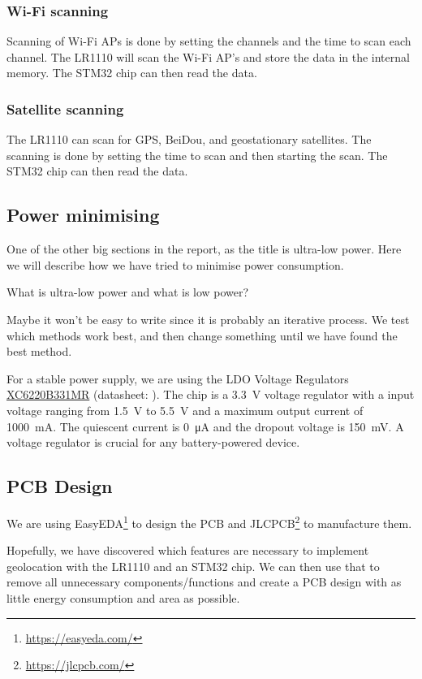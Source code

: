 \subsubsection{Wi-Fi scanning}
Scanning of Wi-Fi \ac{AP}s is done by setting the channels and the time to scan each channel. The LR1110 will scan the Wi-Fi \ac{AP}'s and store the data in the internal memory. The STM32 chip can then read the data.

\subsubsection{Satellite scanning}
The LR1110 can scan for \ac{GPS}, BeiDou, and geostationary satellites. The scanning is done by setting the time to scan and then starting the scan. The STM32 chip can then read the data.

\subsection{Power minimising}
One of the other big sections in the report, as the title is ultra-low power. Here we will describe how we have tried to minimise power consumption.

What is ultra-low power and what is low power?

Maybe it won't be easy to write since it is probably an iterative process. We test which methods work best, and then change something until we have found the best method.


For a stable power supply, we are using the \ac{LDO} Voltage Regulators \hyperref[bom:xc6220]{XC6220B331MR} (datasheet: ). The chip is a \SI{3.3}{\volt} voltage regulator with a input voltage ranging from \SI{1.5}{\volt} to \SI{5.5}{\volt} and a maximum output current of \SI{1000}{\milli\ampere}. The quiescent current is \SI{0}{\micro\ampere} and the dropout voltage is \SI{150}{\milli\volt}. A voltage regulator is crucial for any battery-powered device.

\subsection{PCB Design}
We are using EasyEDA\footnote{\url{https://easyeda.com/}} to design the \ac{PCB} and JLCPCB\footnote{\url{https://jlcpcb.com/}} to manufacture them.

Hopefully, we have discovered which features are necessary to implement geolocation with the LR1110 and an STM32 chip. We can then use that to remove all unnecessary components/functions and create a \ac{PCB} design with as little energy consumption and area as possible.

